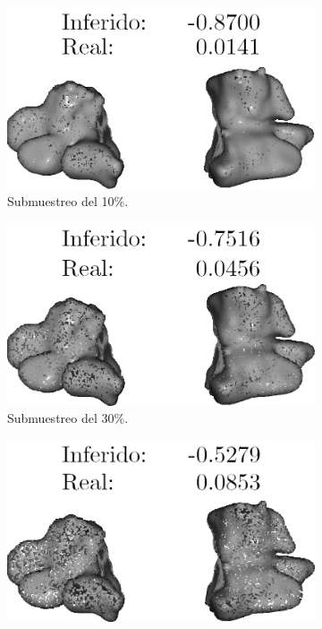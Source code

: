 \begin{figure}[htp]
  \begin{subfigure}[b]{0.31\textwidth}
  \centering
    \includegraphics[width=\textwidth]{imagenes/chapter6/Maxiliar100014_7.png}
  \caption{Submuestreo del 10\%.}
\end{subfigure}\hspace{10pt}
  \begin{subfigure}[b]{0.31\textwidth}
  \centering
    \includegraphics[width=\textwidth]{imagenes/chapter6/Maxiliar100014_9.png}
  \caption{Submuestreo del 30\%.}
\end{subfigure}\hspace{10pt}
  \begin{subfigure}[b]{0.31\textwidth}
  \centering
    \includegraphics[width=\textwidth]{imagenes/chapter6/Maxiliar100014_11.png}

\end{subfigure}
\end{figure}
